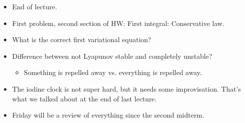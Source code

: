 \documentclass[../notes.tex]{subfiles}
\begin{document}
\begin{itemize}
    \item End of lecture.
    \item First problem, second section of HW: First integral: Conservative law.
    \item What is the correct first variational equation?
    \item Difference between not Lyapunov stable and completely unstable?
    \begin{itemize}
        \item Something is repelled away vs. everything is repelled away.
    \end{itemize}
    \item The iodine clock is not super hard, but it needs some improvisation. That's what we talked about at the end of last lecture.
    \item Friday will be a review of everything since the second midterm.
\end{itemize}
\end{document}
